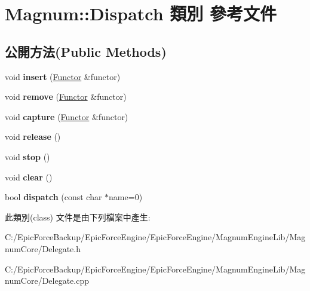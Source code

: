 \hypertarget{class_magnum_1_1_dispatch}{}\section{Magnum\+:\+:Dispatch 類別 參考文件}
\label{class_magnum_1_1_dispatch}
\subsection*{公開方法(Public Methods)}
\begin{DoxyCompactItemize}
\item 
void {\bfseries insert} (\hyperlink{class_magnum_1_1_functor}{Functor} \&functor)\hypertarget{class_magnum_1_1_dispatch_ab3fae5ebf4c1f6068befddc3687fa1a8}{}\label{class_magnum_1_1_dispatch_ab3fae5ebf4c1f6068befddc3687fa1a8}

\item 
void {\bfseries remove} (\hyperlink{class_magnum_1_1_functor}{Functor} \&functor)\hypertarget{class_magnum_1_1_dispatch_a6d3c2269ab7fe872d8a92a51eaee7f54}{}\label{class_magnum_1_1_dispatch_a6d3c2269ab7fe872d8a92a51eaee7f54}

\item 
void {\bfseries capture} (\hyperlink{class_magnum_1_1_functor}{Functor} \&functor)\hypertarget{class_magnum_1_1_dispatch_a682011e28a7698da903ae136ba74d617}{}\label{class_magnum_1_1_dispatch_a682011e28a7698da903ae136ba74d617}

\item 
void {\bfseries release} ()\hypertarget{class_magnum_1_1_dispatch_a1579ea55b98f8a0eb213d97c579b1b6b}{}\label{class_magnum_1_1_dispatch_a1579ea55b98f8a0eb213d97c579b1b6b}

\item 
void {\bfseries stop} ()\hypertarget{class_magnum_1_1_dispatch_a464c2f6db116c45e150fd99b43987372}{}\label{class_magnum_1_1_dispatch_a464c2f6db116c45e150fd99b43987372}

\item 
void {\bfseries clear} ()\hypertarget{class_magnum_1_1_dispatch_a0b3d07604cfe17b84de206a8a373595d}{}\label{class_magnum_1_1_dispatch_a0b3d07604cfe17b84de206a8a373595d}

\item 
bool {\bfseries dispatch} (const char $\ast$name=0)\hypertarget{class_magnum_1_1_dispatch_a71d8a311ef1c107842cc58483c449b3f}{}\label{class_magnum_1_1_dispatch_a71d8a311ef1c107842cc58483c449b3f}

\end{DoxyCompactItemize}


此類別(class) 文件是由下列檔案中產生\+:\begin{DoxyCompactItemize}
\item 
C\+:/\+Epic\+Force\+Backup/\+Epic\+Force\+Engine/\+Epic\+Force\+Engine/\+Magnum\+Engine\+Lib/\+Magnum\+Core/Delegate.\+h\item 
C\+:/\+Epic\+Force\+Backup/\+Epic\+Force\+Engine/\+Epic\+Force\+Engine/\+Magnum\+Engine\+Lib/\+Magnum\+Core/Delegate.\+cpp\end{DoxyCompactItemize}

